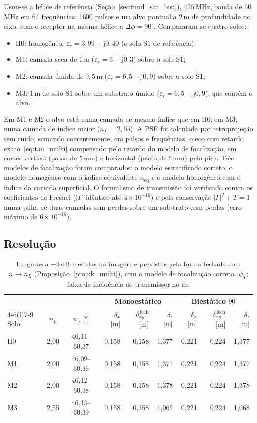 \documentclass[12pt,a4paper,oneside]{book}
\theoremstyle{remark}
\newcommand{\jj}{\mathrm{j}}
\newcommand{\dB}{\,\mathrm{dB}}
\theoremstyle{plain}
\theoremstyle{definition}
\begin{document}
Usou-se a hélice de referência (Seção~\ref{sec:fund_sar_bist}), $425\,$MHz, banda de
$50\,$MHz em 64 frequências, 1600 pulsos e um alvo pontual a $2\,$m de profundidade
no eixo, com o receptor na mesma hélice a $\Delta\phi=90^\circ$. Compararam-se
quatro solos:
\begin{itemize}
  \item H0: homogêneo, $\varepsilon_r=3,99-\jj0,40$ (o solo S1 de referência);
  \item M1: camada seca de $1\,$m ($\varepsilon_r=3-\jj0,3$) sobre o solo S1;
  \item M2: camada úmida de $0,5\,$m ($\varepsilon_r=6,5-\jj0,9$) sobre o solo S1;
  \item M3: $1\,$m de solo S1 sobre um substrato úmido ($\varepsilon_r=6,5-\jj0,9$),
  que contém o alvo.
\end{itemize}
Em M1 e M2 o alvo está numa camada de mesmo índice que em H0; em M3, numa camada
de índice maior ($n_L=2,55$). A PSF foi calculada por retroprojeção sem ruído,
somando coerentemente, em pulsos e frequências, o eco com retardo
exato~\eqref{eq:tau_multi} compensado pelo retardo do modelo de focalização, em
cortes vertical (passo de $5\,$mm) e horizontal (passo de $2\,$mm) pelo pico. Três
modelos de focalização foram comparados: o modelo estratificado correto, o modelo
homogêneo com o índice equivalente $n_{\text{eq}}$ e o modelo homogêneo com o
índice da camada superficial. O formalismo de transmissão foi verificado contra
os coeficientes de Fresnel ($|\Gamma|$ idêntico até $4\times10^{-16}$) e pela
conservação $|\Gamma|^2+T=1$ numa pilha de duas camadas sem perdas sobre um
substrato com perdas (erro máximo de $6\times10^{-16}$).

\subsection{Resolução}

\begin{table}[H]
\centering\small
\caption{Larguras a $-3\dB$ medidas na imagem e previstas pela forma fechada com
$n\to n_L$ (Proposição~\ref{prop:k_multi}), com o modelo de focalização correto.
$\psi_T$: faixa de incidência do transmissor no ar.}
\label{tab:mc_resol}
\begin{tabular}{@{}lccrrrrrr@{}}
\toprule
 & & & \multicolumn{3}{c}{Monoestático} & \multicolumn{3}{c}{Biestático $90^\circ$} \\
\cmidrule(lr){4-6}\cmidrule(l){7-9}
Solo & $n_L$ & $\psi_T$ [°] & $\delta_x$ [m] & $\delta_{xy}^{\,\mathrm{fech}}$ [m] & $\delta_z$ [m] & $\delta_x$ [m] & $\delta_{xy}^{\,\mathrm{fech}}$ [m] & $\delta_z$ [m] \\
\midrule
H0 & 2,00 & 46,11--60,37 & 0,158 & 0,158 & 1,377 & 0,221 & 0,224 & 1,377 \\
M1 & 2,00 & 46,09--60,36 & 0,158 & 0,158 & 1,377 & 0,221 & 0,224 & 1,377 \\
M2 & 2,00 & 46,12--60,38 & 0,158 & 0,158 & 1,378 & 0,221 & 0,224 & 1,378 \\
M3 & 2,55 & 46,13--60,39 & 0,158 & 0,158 & 1,068 & 0,221 & 0,224 & 1,068 \\
\bottomrule
\end{tabular}
\end{table}
\end{document}
